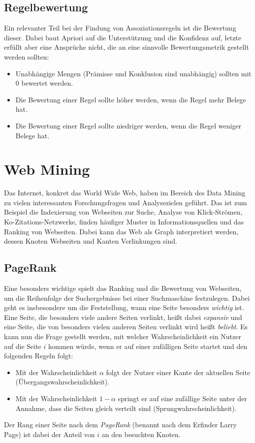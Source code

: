 		\subsection{Regelbewertung}
			Ein relevanter Teil bei der Findung von Assoziationsregeln ist die Bewertung dieser. Dabei baut Apriori auf die Unterstützung und die Konfidenz auf, letzte erfüllt aber eine Ansprüche nicht, die an eine sinnvolle Bewertungsmetrik gestellt werden sollten:
			\begin{itemize}
				\item Unabhängige Mengen (\dh Prämisse und Konklusion sind unabhängig) sollten mit \num{0} bewertet werden.
				\item Die Bewertung einer Regel sollte höher werden, wenn die Regel mehr Belege hat.
				\item Die Bewertung einer Regel sollte niedriger werden, wenn die Regel weniger Belege hat.
			\end{itemize}

	\section{Web Mining}
		Das Internet, \bzw konkret das World Wide Web, haben im Bereich des Data Mining zu vielen interessanten Forschungsfragen und Analysezielen geführt. Das ist zum Beispiel die Indexierung von Webseiten zur Suche, Analyse von Klick-Strömen, Ko-Zitations-Netzwerke, finden häufiger Muster in Informationsquellen und das Ranking von Webseiten. Dabei kann das Web als Graph interpretiert werden, dessen Knoten Webseiten und Kanten Verlinkungen sind.

		\subsection{PageRank}
			Eine besonders wichtige spielt das Ranking und die Bewertung von Webseiten, \bspw um die Reihenfolge der Suchergebnisse bei einer Suchmaschine festzulegen. Dabei geht es insbesondere um die Feststellung, wann eine Seite besonders \emph{wichtig} ist. Eine Seite, die besonders viele andere Seiten verlinkt, heißt dabei \emph{expansiv} und eine Seite, die von besonders vielen anderen Seiten verlinkt wird heißt \emph{beliebt}. Es kann nun die Frage gestellt werden, mit welcher Wahrscheinlichkeit ein Nutzer auf die Seite \(i\) kommen würde, wenn er auf einer zufälligen Seite startet und den folgenden Regeln folgt:
			\begin{itemize}
				\item Mit der Wahrscheinlichkeit \(\alpha\) folgt der Nutzer einer Kante der aktuellen Seite (Übergangswahrscheinlichkeit).
				\item Mit der Wahrscheinlichkeit \(1 - \alpha\) springt er auf eine zufällige Seite unter der Annahme, dass die Seiten gleich verteilt sind (Sprungwahrscheinlichkeit).
			\end{itemize}
			Der Rang einer Seite nach dem \emph{PageRank} (benannt nach dem Erfinder Larry Page) ist dabei der Anteil von \(i\) an den besuchten Knoten.

